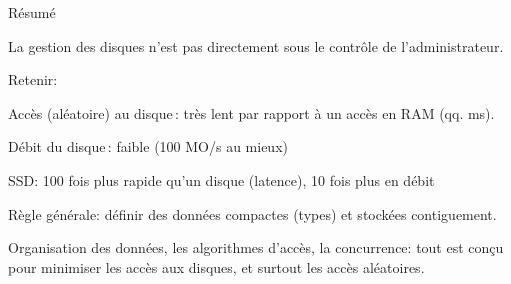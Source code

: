 \begin{frame}{Résumé}

La gestion des disques n'est pas directement sous le contrôle de l'administrateur. 

\vfill 
\alert{Retenir}:

\begin{redbullet}
  \item Accès (aléatoire) au disque\,: très lent par rapport à un accès en RAM (qq. ms).
  \item Débit du disque\,: faible (100 MO/s au mieux)
  \item SSD: 100 fois plus rapide qu'un disque (latence), 10 fois plus en débit
\end{redbullet}

\vfill

\begin{blocgauche}

\alert{Règle générale}: définir des données compactes (types) et stockées contiguement.

\medskip

Organisation des données, les algorithmes d'accès, la concurrence: tout est conçu pour minimiser
les accès aux disques, et surtout les accès \alert{aléatoires}.
\end{blocgauche}

\end{frame}
